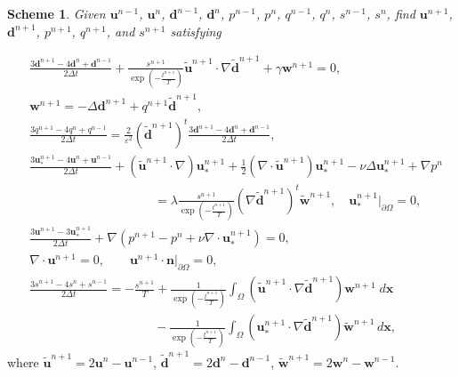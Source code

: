 \documentclass[12pt,reqno]{amsart}
\numberwithin{equation}{section}
\newtheorem{sch}{Scheme}[section]
\newcommand{\uu}{\mathrm{\textbf{u}}}
\newcommand{\dd}{\mathrm{\textbf{d}}}
\newcommand{\ww}{\mathrm{\textbf{w}}}
\newcommand{\bx}{\mathrm{\textbf{x}}}
\newcommand{\nn}{\textbf{n}}
\begin{document}
\begin{sch}\label{2stPCSAV}
Given $\uu^{n-1}$, $\uu^n$, $\dd^{n-1}$, $\dd^{n}$, $p^{n-1}$, $p^n$, $q^{n-1}$, $q^n$, $s^{n-1}$, $s^n$, find $\uu^{n+1}$, $\dd^{n+1}$, $p^{n+1}$, $q^{n+1}$, and $s^{n+1}$ satisfying
\end{sch}
\begin{align}
&\frac{3\dd^{n+1}-4\dd^{n}+\dd^{n-1}}{2\Delta t}+\frac{s^{n+1}}{\exp\left(-\frac{t^{n+1}}{T}\right)} \tilde{\uu}^{n+1}\cdot\nabla \tilde{\dd}^{n+1} +\gamma\ww^{n+1}=0,\label{eq:2stPCSAV2}\\
&\ww^{n+1} = -\Delta\dd^{n+1}+q^{n+1}\tilde{\dd}^{n+1},\label{eq:2weq}\\
&\frac{3q^{n+1}-4q^{n}+q^{n-1}}{2\Delta t}=\frac{2}{\varepsilon^2}\left( \tilde{\dd}^{n+1}\right)^t \frac{3\dd^{n+1}-4\dd^{n}+\dd^{n-1}}{2\Delta t}, \label{eq:2stPCSAV3}\\
&\frac{3\uu_*^{n+1}-4\uu^{n}+\uu^{n-1}}{2\Delta t}+
\left(\tilde{\uu}^{n+1}\cdot\nabla\right)\uu_*^{n+1}+\frac{1}{2}\left(\nabla\cdot\tilde{\uu}^{n+1}\right)\uu_*^{n+1}
-\nu\Delta\uu_*^{n+1}+\nabla p^{n} \nonumber \\
&\qquad\qquad\qquad\qquad\qquad =\lambda\frac{s^{n+1}}{\exp\left(-\frac{t^{n+1}}{T}\right)} \left(\nabla\tilde{\dd}^{n+1}\right)^t \tilde{\ww}^{n+1},\quad\uu_*^{n+1}|_{\partial\Omega}=0,\label{eq:2stPCSAV4}\\
&\frac{3\uu^{n+1}-3\uu_*^{n+1}}{2\Delta t}
+\nabla\left(p^{n+1}-p^n+\nu\nabla\cdot\uu_*^{n+1}\right)=0,\label{eq:2stPCSAV5}\\
&\nabla\cdot\uu^{n+1}=0,\qquad \uu^{n+1}\cdot\nn|_{\partial\Omega}=0,\label{eq:nabu0}\\
&\frac{3s^{n+1}-4s^{n}+s^{n-1}}{2\Delta t}
= -\frac{s^{n+1}}{T} + \frac{1}{\exp\left(-\frac{t^{n+1}}{T}\right)} \int_{\Omega}\left(\tilde{\uu}^{n+1}\cdot \nabla\tilde{\dd}^{n+1}\right)\ww^{n+1}\;d\bx\nonumber\\
&\qquad\qquad\qquad\quad\quad\quad\quad-\frac{1}{\exp\left(-\frac{t^{n+1}}{T}\right)} \int_{\Omega}\left(\uu_*^{n+1}\cdot \nabla\tilde{\dd}^{n+1}\right)\tilde{\ww}^{n+1} \, d\bx,\label{eq:2stPCSAV6}
\end{align}
where $\tilde{\uu}^{n+1}=2\uu^n-\uu^{n-1}$, $\tilde{\dd}^{n+1}=2\dd^n-\dd^{n-1}$, $\tilde{\ww}^{n+1}=2\ww^n-\ww^{n-1}$. 
\end{document}
